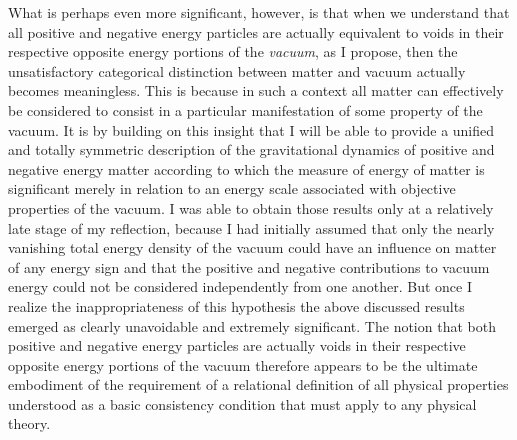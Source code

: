 \documentclass[notitlepage,12pt]{report}
\begin{document}
What is perhaps even more significant, however, is that when we understand that all positive and negative energy particles are actually equivalent to voids in their respective opposite energy portions of the \textit{vacuum}, as I propose, then the unsatisfactory categorical distinction between matter and vacuum actually becomes meaningless. This is because in such a context all matter can effectively be considered to consist in a particular manifestation of some property of the vacuum. It is by building on this insight that I will be able to provide a unified and totally symmetric description of the gravitational dynamics of positive and negative energy matter according to which the measure of energy of matter is significant merely in relation to an energy scale associated with objective properties of the vacuum. I was able to obtain those results only at a relatively late stage of my reflection, because I had initially assumed that only the nearly vanishing total energy density of the vacuum could have an influence on matter of any energy sign and that the positive and negative contributions to vacuum energy could not be considered independently from one another. But once I realize the inappropriateness of this hypothesis the above discussed results emerged as clearly unavoidable and extremely significant. The notion that both positive and negative energy particles are actually voids in their respective opposite energy portions of the vacuum therefore appears to be the ultimate embodiment of the requirement of a relational definition of all physical properties understood as a basic consistency condition that must apply to any physical theory.

\bigskip
\end{document}
